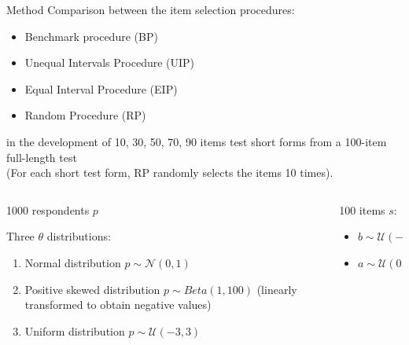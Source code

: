 \documentclass[final,t]{beamer}
\begin{document}
\begin{frame}
\begin{columns}[t]
			
			
			\begin{column}{.45\linewidth}
				
		\begin{block}{\centering Method}
			Comparison between the item selection procedures: 
			\begin{itemize}
				\item Benchmark procedure (BP)
				\item Unequal Intervals Procedure (UIP)
				\item Equal Interval Procedure (EIP)
				\item Random Procedure (RP)
			\end{itemize}
		in the development of 10, 30, 50, 70, 90 items test short forms from a  100-item full-length test \\
		(For each short test form, RP randomly selects the items 10 times).
			\begin{columns}
				\begin{column}{.50\linewidth}
					\begin{center}
						1000 respondents $p$
					\end{center}
					Three $\theta$ distributions: 
					\begin{enumerate}
						\item Normal distribution $p \sim \mathcal{N}(0,1)$
						\item Positive skewed distribution $p \sim Beta(1, 100)$ (linearly transformed to obtain negative values)
						\item Uniform distribution $p \sim \mathcal{U}(-3,3)$
					\end{enumerate}
					
				\end{column}
				
				\begin{column}{.50\linewidth}
					\begin{center}
						100 items $s$:
					\end{center}
					\begin{itemize}
						\item $b \sim \mathcal{U}(-3,3)$
						\item  $a \sim \mathcal{U}(0.40,2)$
					\end{itemize}
				\end{column}
			\end{columns}
	
	\end{block}
				

\end{column}
\end{columns}
\end{frame}
\end{document}
